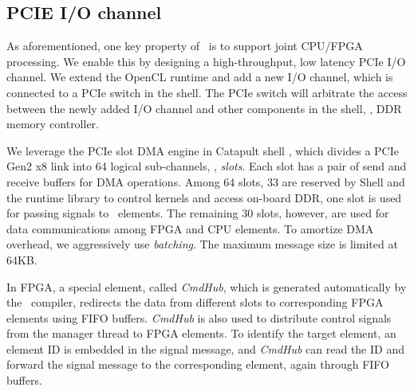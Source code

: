 \subsection{PCIE I/O channel}
\label{clicknp:subsec:pcie}

As aforementioned, one key property of \name\ is to support joint CPU/FPGA processing. 
We enable this by designing a high-throughput, low latency PCIe I/O channel. 
%
We extend the OpenCL runtime and add a new I/O channel, which is connected to 
a PCIe switch in the shell. 
The PCIe switch will arbitrate the access between the newly added I/O channel
and other components in the shell, \eg, DDR memory controller.

We leverage the PCIe slot DMA engine in Catapult shell \cite{putnam2014reconfigurable}, which divides a PCIe Gen2 x8 link into 64 logical sub-channels, \ie, \textit{slots}.
Each slot has a pair of send and receive buffers for DMA operations.
%
Among 64 slots, 33 are reserved by Shell and the runtime library to control kernels and access on-board DDR, one slot is used for passing signals to \name\ elements. 
The remaining 30 slots, however, are used for data communications among FPGA and CPU elements.
%
To amortize DMA overhead, we aggressively use \textit{batching}. The maximum message size 
is limited at 64KB. 



In FPGA, a special element, called \textit{CmdHub}, which is generated automatically by the \name\ compiler, 
redirects the data from different slots to corresponding FPGA elements 
using FIFO buffers.
\textit{CmdHub} is also used to distribute control signals from the manager 
thread to FPGA elements.
To identify the target element, an element ID is embedded in the signal message,
and \textit{CmdHub} can read the ID and forward the signal message to 
the corresponding element, again through FIFO buffers. 

